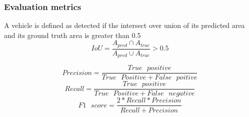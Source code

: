 \documentclass[aspectratio=1610]{beamer}
\begin{document}
\begin{frame}
  \frametitle{\hfill Evaluation metrics}
  A vehicle is defined as detected if the intersect over union of its predicted area and its ground truth area is greater than 0.5
	  \begin{equation*}\label{eq:mce}
	IoU = \frac{A_{pred}\cap A_{true}}{A_{pred} \cup A_{true}}>0.5
	\end{equation*}

\begin{equation*}
Precision=\frac{True\textit{ }positive}{True\textit{ }Positive+False\textit{ }poitive}
\end{equation*}
\begin{equation*}
Recall=\frac{True\textit{ }positive}{True\textit{ }Positive+False\textit{ }negative}
\end{equation*}
\begin{equation*}
F1\textit{ }score=\frac{2*Recall*Precision}{Recall+Precision}
\end{equation*}
\end{frame}
\end{document}
